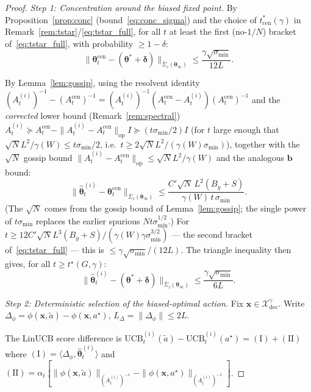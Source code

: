 \documentclass[11pt]{article}
\begin{document}
\begin{proof}
\textit{Step 1: Concentration around the biased fixed point.}
By Proposition~\ref{prop:conc} (bound~\eqref{eq:conc_sigma}) and the
choice of $t_{\mathrm{cen}}^*(\gamma)$ in
Remark~\ref{rem:tstar}/\eqref{eq:tstar_full}, for all $t$ at least the
first (no-$1/N$) bracket of~\eqref{eq:tstar_full}, with probability
$\geq 1-\delta$:
\[
\|\bm{\theta}_t^{\mathrm{cen}}-(\bm{\theta}^{\!*}+\bm{\delta})\|_{\bar{\Sigma}_z(\bm{\theta}_\infty)}
\leq\frac{\gamma\sqrt{\sigma_{\min}}}{12L}.
\]

By Lemma~\ref{lem:gossip}, using the resolvent identity
$(A_t^{(i)})^{-1}-(A_t^{\mathrm{cen}})^{-1}
=(A_t^{(i)})^{-1}(A_t^{\mathrm{cen}}-A_t^{(i)})(A_t^{\mathrm{cen}})^{-1}$
and the \emph{corrected} lower bound (Remark~\ref{rem:spectral})
$A_t^{(i)}\succeq A_t^{\mathrm{cen}}-\|A_t^{(i)}-A_t^{\mathrm{cen}}\|_{\mathrm{op}} I
\succeq(t\sigma_{\min}/2)I$
(for $t$ large enough that
$\sqrt{N}L^2/\gamma(W)\leq t\sigma_{\min}/2$, i.e.\
$t\geq 2\sqrt N L^2/(\gamma(W)\sigma_{\min})$), together with the
$\sqrt N$ gossip bound $\|A_t^{(i)}-A_t^{\mathrm{cen}}\|_{\mathrm{op}}\leq
\sqrt N L^2/\gamma(W)$ and the analogous $\bm{b}$ bound:
\[
\|\widehat{\bm{\theta}}_t^{(i)}-\bm{\theta}_t^{\mathrm{cen}}\|_{\bar{\Sigma}_z(\bm{\theta}_\infty)}
\leq\frac{C'\sqrt{N}\,L^2(B_y+S)}{\gamma(W)\,t\,\sigma_{\min}}.
\]
(The $\sqrt N$ comes from the gossip bound of Lemma~\ref{lem:gossip};
the single power of $t\sigma_{\min}$ replaces the earlier spurious
$Nt\sigma_{\min}^{1/2}$.)  For
$t\geq 12C'\sqrt N L^3(B_y+S)/(\gamma(W)\gamma\sigma_{\min}^{3/2})$
--- the second bracket of~\eqref{eq:tstar_full} --- this is
$\leq\gamma\sqrt{\sigma_{\min}}/(12L)$.
The triangle inequality then gives, for all $t\geq t^\star(G,\gamma)$:
\begin{equation}
\|\widehat{\bm{\theta}}_t^{(i)}-(\bm{\theta}^{\!*}+\bm{\delta})\|_{\bar{\Sigma}_z(\bm{\theta}_\infty)}
\leq\frac{\gamma\sqrt{\sigma_{\min}}}{6L}.
\label{eq:theta_hat_close}
\end{equation}

\textit{Step 2: Deterministic selection of the biased-optimal action.}
Fix $\bm{x}\in\mathcal{X}_{\mathrm{dec}}^\gamma$.
Write $\Delta_\phi=\phi(\bm{x},\tilde{a})-\phi(\bm{x},a^\star)$,
$L_\Delta=\|\Delta_\phi\|\leq 2L$.

The LinUCB score difference is
$\mathrm{UCB}_t^{(i)}(\tilde{a})-\mathrm{UCB}_t^{(i)}(a^\star)
=(\mathrm{I})+(\mathrm{II})$
where $(\mathrm{I})=\langle\Delta_\phi,\widehat{\bm{\theta}}_t^{(i)}\rangle$
and $(\mathrm{II})=\alpha_t[\|\phi(\bm{x},\tilde{a})\|_{(A_t^{(i)})^{-1}}
-\|\phi(\bm{x},a^\star)\|_{(A_t^{(i)})^{-1}}]$.


\end{proof}
\end{document}
